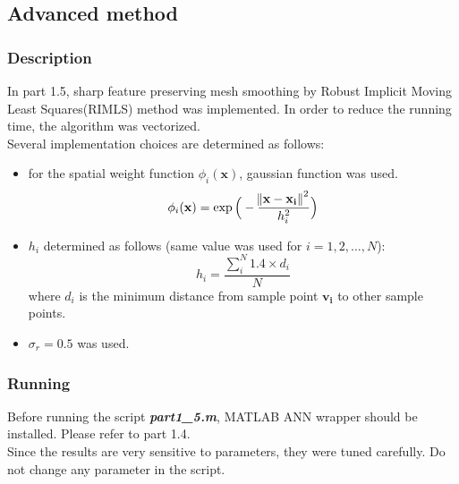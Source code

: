 \documentclass[paper=a4, fontsize=11pt]{scrartcl} %
\numberwithin{equation}{section} %
\numberwithin{figure}{section} %
\numberwithin{table}{section} %
\newcommand{\filename}[1]{\textbf{\textit{#1}}}
\renewcommand{\vec}[1]{\mathbf{#1}}
\begin{document}
\subsection{Advanced method}

\subsubsection{Description}

In part 1.5, sharp feature preserving mesh smoothing by Robust Implicit Moving Least Squares(RIMLS) method was implemented. In order to reduce the running time, the algorithm was vectorized. \\

Several implementation choices are determined as follows:

\begin{itemize}
	\item 
	for the spatial weight function $\phi_i(\vec{x})$, gaussian function was used. 
	\begin{equation*}
	\phi_i(\vec{x}) = \exp \Big( - \frac{\norm{\vec{x} - \vec{x_i}} ^2}{h_i^2} \Big)
	\end{equation*} 
	\item $h_i$ determined as follows (same value was used for $i = 1, 2, \dots, N$):
	\begin{equation*} h_i = \frac{\sum_{i}^{N} 1.4 \times d_i}{N} \end{equation*}
	where $d_i$ is the minimum distance from sample point $\vec{v_i}$ to other sample points.
	\item $\sigma_r = 0.5$ was used. 
\end{itemize}


\subsubsection{Running} 

Before running the script \filename{part1\_5.m}, MATLAB ANN wrapper should be installed. Please refer to part 1.4. \\
Since the results are very sensitive to parameters, they were tuned carefully. Do not change any parameter in the script.
\end{document}
